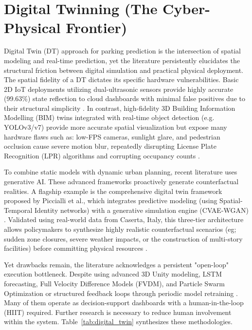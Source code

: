 \documentclass[conference]{IEEEtran}
\begin{document}
\section{Digital Twinning (The Cyber-Physical Frontier)}
Digital Twin (DT) approach for parking prediction is the intersection of spatial modeling and real-time prediction, yet the literature persistently elucidates the structural friction between digital simulation and practical physical deployment. The spatial fidelity of a DT dictates its specific hardware vulnerabilities. Basic 2D IoT deployments utilizing dual-ultrasonic sensors provide highly accurate (99.63\%) state reflection to cloud dashboards with minimal false positives due to their structural simplicity \cite{b3}. In contrast, high-fidelity 3D Building Information Modelling (BIM) twins integrated with real-time object detection (e.g. YOLOv3/v7) provide more accurate spatial visualization but expose many hardware flaws such as: low-FPS cameras, sunlight glare, and pedestrian occlusion cause severe motion blur, repeatedly disrupting License Plate Recognition (LPR) algorithms and corrupting occupancy counts \cite{b2,b13}.

To combine static models with dynamic urban planning, recent literature uses generative AI. These advanced frameworks proactively generate counterfactual realities. A flagship example is the comprehensive digital twin framework proposed by Piccialli et al., which integrates predictive modeling (using Spatial-Temporal Identity networks) with a generative simulation engine (CVAE-WGAN) \cite{b1}. Validated using real-world data from Caserta, Italy, this three-tier architecture allows policymakers to synthesize highly realistic counterfactual scenarios (eg; sudden zone closures, severe weather impacts, or the construction of multi-story facilities) before committing physical resources \cite{b1,b20}.

Yet drawbacks remain, the literature acknowledges a persistent "open-loop" execution bottleneck. Despite using advanced 3D Unity modeling, LSTM forecasting, Full Velocity Difference Models (FVDM), and Particle Swarm Optimization \cite{b19,b4,b38} or structured feedback loops through periodic model retraining \cite{b1}. Many of them operate as decision-support dashboards with a human-in-the-loop (HIIT) required. Further research is necessary to reduce human involvement within the system.
Table~\ref{tab:digital_twin} synthesizes these methodologies.
\end{document}

